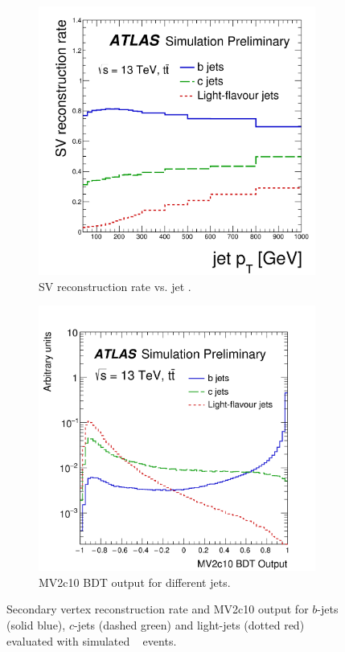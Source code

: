 \begin{figure}[htbp!]
\centering
\captionsetup{justification=centering}
    \begin{subfigure}[b]{0.4\textwidth}
        \includegraphics[width=\textwidth]{figures/object/b_sv}
        \caption{SV reconstruction rate vs. jet \pt.}
        \label{fig:obj_b_sv}
    \end{subfigure}
    \quad
    \begin{subfigure}[b]{0.43\textwidth}
        \includegraphics[width=\textwidth]{figures/object/b_mv2}
        \caption{MV2c10 BDT output for different jets.}
        \label{fig:obj_b_mv2}
    \end{subfigure}
\caption{Secondary vertex reconstruction rate and MV2c10 output for $b$-jets (solid blue), $c$-jets (dashed green) and light-jets (dotted red) evaluated with simulated \ttbar~ events.}
\label{fig:obj_btag}
\end{figure}

